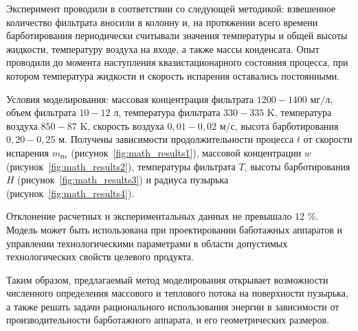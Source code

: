 Эксперимент проводили в соответствии со следующей методикой: взвешенное количество фильтрата вносили в колонну и, на протяжении всего времени барботирования периодически считывали значения температуры и общей высоты жидкости, температуру воздуха на входе, а также массы конденсата. 
Опыт проводили до момента наступления квазистационарного состояния процесса, при котором температура жидкости и скорость испарения оставались постоянными.

Условия моделирования: массовая концентрация фильтрата ${ 1200-1400}$ \(мг/л\), объем фильтрата ${ 10-12}$ л, температура фильтрата ${ 330-335}$
K, температура воздуха ${ 850-87 }$ K, скорость воздуха ${ 0,01-0,0}{ 2}$ \(м/с\), высота барботирования ${ 0,20-0,25}$ м. Получены зависимости продолжительности процесса $t$ от скорости испарения $m_{{ пs}}$ (рисунок~\ref{fig:math_results1}), массовой концентрации $w$ (рисунок~\ref{fig:math_results2}), температуры фильтрата $T$, высоты барботирования $H$ (рисунок~\ref{fig:math_results3}) и радиуса пузырька (рисунок~\ref{fig:math_results4}).

Отклонение расчетных и экспериментальных данных не превышало ${ 12}$ \%. 
Модель может быть использована при проектировании баботажных аппаратов и управлении технологическими параметрами в области допустимых технологических свойств целевого продукта.

Таким образом, предлагаемый метод моделирования открывает возможности численного определения массового и теплового потока на поверхности пузырька, а также решать задачи рационального использования энергии в зависимости от производительности барботажного аппарата, и его геометрических размеров.
